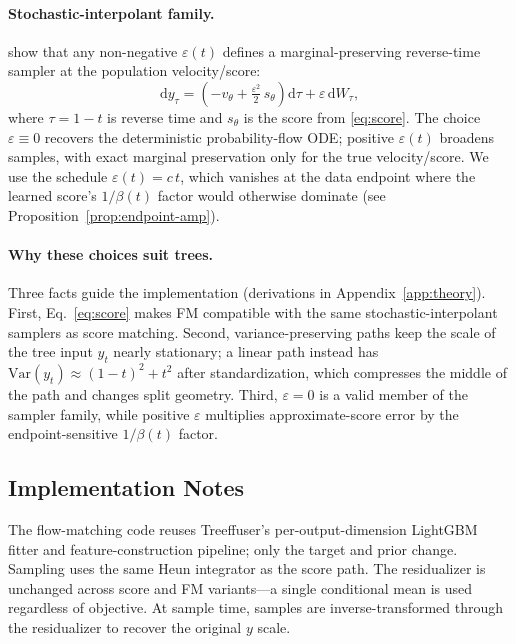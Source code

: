 \documentclass{uai2026}
\newcommand{\Var}{\mathrm{Var}}
\newcommand{\dd}{\mathrm{d}}
\begin{document}
\paragraph{Stochastic-interpolant family.} \citet{albergo2023stochastic} show that any non-negative $\varepsilon(t)$ defines a marginal-preserving reverse-time sampler at the population velocity/score:
\begin{equation}\label{eq:sde}
\dd y_\tau = \left(-v_\theta + \tfrac{\varepsilon^2}{2}\, s_\theta\right) \dd \tau + \varepsilon\, \dd W_\tau,
\end{equation}
where $\tau = 1 - t$ is reverse time and $s_\theta$ is the score from \eqref{eq:score}. The choice $\varepsilon \equiv 0$ recovers the deterministic probability-flow ODE; positive $\varepsilon(t)$ broadens samples, with exact marginal preservation only for the true velocity/score. We use the schedule $\varepsilon(t) = c\, t$, which vanishes at the data endpoint where the learned score's $1/\beta(t)$ factor would otherwise dominate (see Proposition~\ref{prop:endpoint-amp}).

\paragraph{Why these choices suit trees.} Three facts guide the implementation (derivations in Appendix~\ref{app:theory}). First, Eq.~\eqref{eq:score} makes FM compatible with the same stochastic-interpolant samplers as score matching. Second, variance-preserving paths keep the scale of the tree input $y_t$ nearly stationary; a linear path instead has $\Var(y_t)\approx(1-t)^2+t^2$ after standardization, which compresses the middle of the path and changes split geometry. Third, $\varepsilon=0$ is a valid member of the sampler family, while positive $\varepsilon$ multiplies approximate-score error by the endpoint-sensitive $1/\beta(t)$ factor.

\subsection{Implementation Notes}\label{sec:impl}
The flow-matching code reuses Treeffuser's per-output-dimension LightGBM fitter and feature-construction pipeline; only the target and prior change. Sampling uses the same Heun integrator as the score path. The residualizer is unchanged across score and FM variants---a single conditional mean is used regardless of objective. At sample time, samples are inverse-transformed through the residualizer to recover the original $y$ scale.
\end{document}
